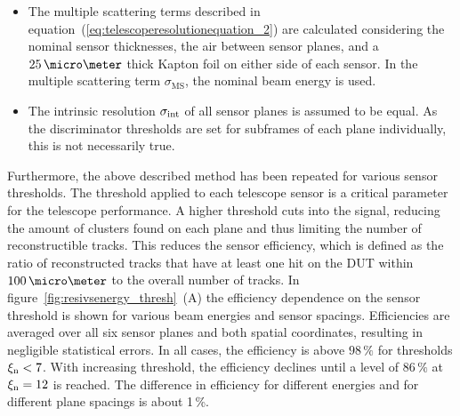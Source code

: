 \begin{itemize}

\item The multiple scattering terms described in equation~(\ref{eq:telescoperesolutionequation_2}) are calculated considering the nominal sensor thicknesses, the air between sensor planes, and a $25\,\micro\meter$
thick Kapton foil on either side of each sensor.
In the multiple scattering term $\sigma_{\textrm{MS}}$, the nominal beam energy is used. 

\item The intrinsic resolution $\sigma_{\textrm{int}}$ of all sensor planes is assumed to be equal.
As the discriminator thresholds are set for subframes of each plane individually, this is not necessarily true.

\end{itemize}


Furthermore, the above described method has been repeated for various sensor thresholds.
The threshold applied to each telescope sensor is a critical parameter for the telescope performance.
A higher threshold cuts into the signal, reducing the amount of clusters found on each plane and thus limiting the number of reconstructible tracks.
This reduces the sensor efficiency, which is defined as the ratio of reconstructed tracks that have at least one hit on the DUT within $100\,\micro\meter$ to the overall number of tracks.
In figure~\ref{fig:resivsenergy_thresh}~(A) the efficiency dependence on the sensor threshold is shown for various beam energies and sensor spacings.
Efficiencies are averaged over all six sensor planes and both spatial coordinates, resulting in negligible statistical errors. 
In all cases, the efficiency is above $98\,\%$ for thresholds $\xi_{\textrm{n}} < 7$.
With increasing threshold, the efficiency declines until a level of $86\,\%$ at $\xi_{\textrm{n}} = 12$ is reached.
The difference in efficiency for different energies and for different plane spacings is about 1\,\%. %

